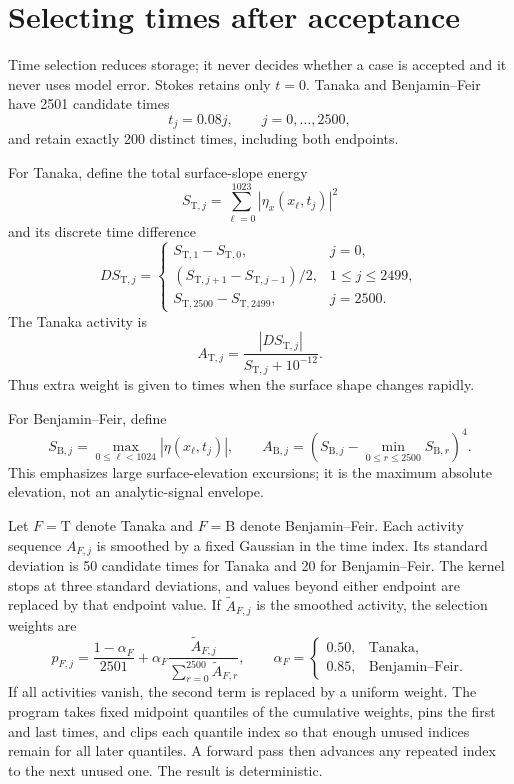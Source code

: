 \documentclass[10pt]{article}
\begin{document}
\section{Selecting times after acceptance}
\label{sec:time-selection}

Time selection reduces storage; it never decides whether a case is accepted
and it never uses model error.  Stokes retains only $t=0$.
Tanaka and Benjamin--Feir have 2501 candidate times
\[
  t_j=0.08j,\qquad j=0,\ldots,2500,
\]
and retain exactly 200 distinct times, including both endpoints.

For Tanaka, define the total surface-slope energy
\[
  S_{\mathrm T,j}
  =
  \sum_{\ell=0}^{1023}
  |\eta_x(x_\ell,t_j)|^2
\]
and its discrete time difference
\[
  D S_{\mathrm T,j}
  =
  \begin{cases}
    S_{\mathrm T,1}-S_{\mathrm T,0},&j=0,\\
    (S_{\mathrm T,j+1}-S_{\mathrm T,j-1})/2,&1\leq j\leq2499,\\
    S_{\mathrm T,2500}-S_{\mathrm T,2499},&j=2500.
  \end{cases}
\]
The Tanaka activity is
\[
  A_{\mathrm T,j}
  =
  \frac{|D S_{\mathrm T,j}|}
       {S_{\mathrm T,j}+10^{-12}}.
\]
Thus extra weight is given to times when the
surface shape changes rapidly.

For Benjamin--Feir, define
\[
  S_{\mathrm B,j}
  =
  \max_{0\leq\ell<1024}|\eta(x_\ell,t_j)|,
  \qquad
  A_{\mathrm B,j}
  =
  \left(
    S_{\mathrm B,j}
    -\min_{0\leq r\leq2500}S_{\mathrm B,r}
  \right)^4.
\]
This emphasizes large surface-elevation excursions; it is the maximum
absolute elevation, not an analytic-signal envelope.

Let $F=\mathrm T$ denote Tanaka and $F=\mathrm B$ denote Benjamin--Feir.
Each activity sequence $A_{F,j}$ is smoothed by a fixed Gaussian in the time
index.  Its standard deviation is 50 candidate times for Tanaka and 20 for
Benjamin--Feir.  The kernel stops at three standard deviations, and values
beyond either endpoint are replaced by that endpoint value.  If
$\widetilde A_{F,j}$ is the smoothed activity, the selection weights are
\[
  p_{F,j}
  =
  \frac{1-\alpha_F}{2501}
  +
  \alpha_F
  \frac{\widetilde A_{F,j}}
       {\sum_{r=0}^{2500}\widetilde A_{F,r}},
  \qquad
  \alpha_F=
  \begin{cases}
    0.50,&\text{Tanaka},\\
    0.85,&\text{Benjamin--Feir}.
  \end{cases}
\]
If all activities vanish, the second term is replaced by a uniform weight.
The program takes fixed midpoint quantiles of the cumulative weights, pins
the first and last times, and clips each quantile index so that enough unused
indices remain for all later quantiles.  A forward pass then advances any
repeated index to the next unused one.  The result is deterministic.
\end{document}
